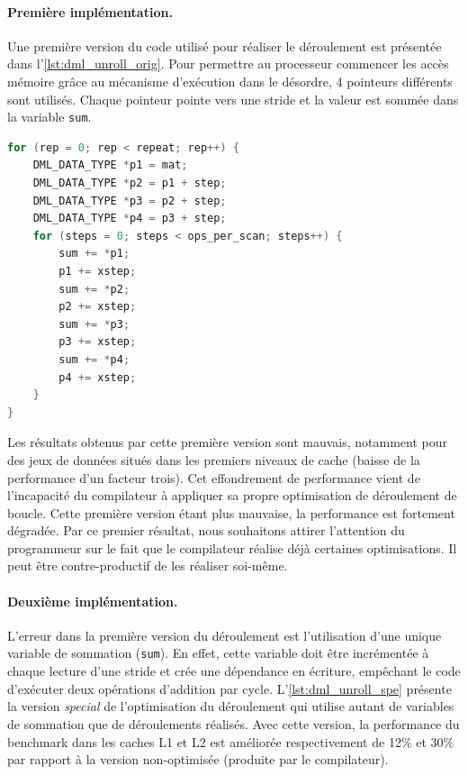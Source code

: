     \paragraph{Première implémentation.}
    
        Une première version du code utilisé pour réaliser le déroulement est présentée dans l'\autoref{lst:dml_unroll_orig}. Pour permettre au processeur commencer les accès mémoire grâce au mécanisme d'exécution dans le désordre, 4 pointeurs différents sont utilisés. Chaque pointeur pointe vers une stride et la valeur est sommée dans la variable \verb|sum|.  
    
        \begin{lstlisting}[label=lst:dml_unroll_orig ,language=C, caption=Première version du déroulement de la boucle par 4.]
for (rep = 0; rep < repeat; rep++) {
    DML_DATA_TYPE *p1 = mat;
    DML_DATA_TYPE *p2 = p1 + step;
    DML_DATA_TYPE *p3 = p2 + step;
    DML_DATA_TYPE *p4 = p3 + step;
    for (steps = 0; steps < ops_per_scan; steps++) {
        sum += *p1;
        p1 += xstep;
        sum += *p2;
        p2 += xstep;
        sum += *p3;
        p3 += xstep;
        sum += *p4;
        p4 += xstep;
    }
}
\end{lstlisting}
    
         Les résultats obtenus par cette première version sont mauvais, notamment pour des jeux de données situés dans les premiers niveaux de cache (baisse de la performance d'un facteur trois). Cet effondrement de performance vient de l'incapacité du compilateur à appliquer sa propre optimisation de déroulement de boucle. Cette première version étant plus mauvaise, la performance est fortement dégradée. Par ce premier résultat, nous souhaitons attirer l'attention du programmeur sur le fait que le compilateur réalise déjà certaines optimisations. Il peut être contre-productif de les réaliser soi-même.

    \paragraph{Deuxième implémentation.}
    
        L'erreur dans la première version du déroulement est l'utilisation d'une unique variable de sommation (\verb=sum=). En effet, cette variable doit être incrémentée à chaque lecture d'une stride et crée une dépendance en écriture, empêchant le code d'exécuter deux opérations d'addition par cycle. L'\autoref{lst:dml_unroll_spe} présente la version \textit{special} de l'optimisation du déroulement qui utilise autant de variables de sommation que de déroulements réalisés. Avec cette version, la performance du benchmark dans les caches L1 et L2 est améliorée respectivement de 12\% et 30\% par rapport à la version non-optimisée (produite par le compilateur).
    
